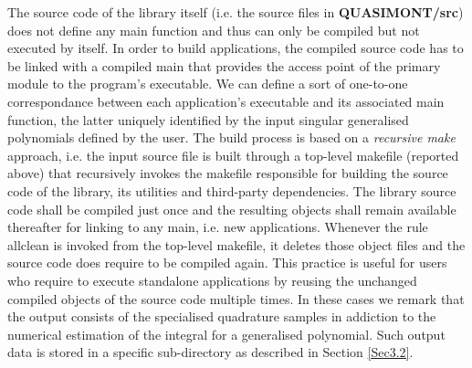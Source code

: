 \documentclass[a4paper, twosided]{book}
\begin{document}
\vspace{0.2cm}
\vspace{0.3cm}

\noindent
The source code of the library itself (i.e. the source files in \colorbox{poliGrayBlue}{\textbf{QUASIMONT/src}}) does not define any \colorbox{poliGrayBlue}{main} function and thus can only be compiled but not executed by itself. In order to build applications, the compiled source code has to be linked with a compiled \colorbox{poliGrayBlue}{main} that provides the access point of the primary module to the program's executable. We can define a sort of one-to-one correspondance between each application's executable and its associated \colorbox{poliGrayBlue}{main} function, the latter uniquely identified by the input singular generalised polynomials defined by the user. The build process is based on a \textsl{recursive make} approach, i.e. the input source file is built through a top-level \colorbox{poliGrayBlue}{makefile} (reported above) that recursively invokes the \colorbox{poliGrayBlue}{makefile} responsible for building the source code of the library, its utilities and third-party dependencies. The library source code shall be compiled just once and the resulting objects shall remain available thereafter for linking to any \colorbox{poliGrayBlue}{main}, i.e. new applications. Whenever the rule \colorbox{poliGrayBlue}{allclean} is invoked from the top-level \colorbox{poliGrayBlue}{makefile}, it deletes those object files and the source code does require to be compiled again. This practice is useful for users who require to execute standalone applications by reusing the unchanged compiled objects of the source code multiple times. In these cases we remark that the output consists of the specialised quadrature samples in addiction to the numerical estimation of the integral for a generalised polynomial. Such output data is stored in a specific sub-directory as described in Section \ref{Sec3.2}.
\end{document}

